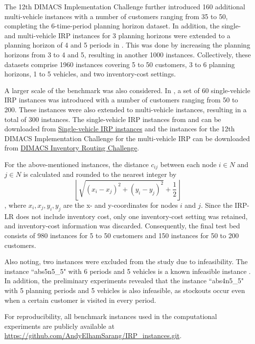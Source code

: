 \documentclass{article}
\begin{document}
The 12th DIMACS Implementation Challenge further introduced 160 additional multi-vehicle instances with a number of customers ranging from 35 to 50, completing the 6-time-period planning horizon dataset. In addition, the single- and multi-vehicle IRP instances for 3 planning horizons were extended to a planning horizon of 4 and 5 periods in \cite{archetti2017logistic}. This was done by increasing the planning horizons from 3 to 4 and 5, resulting in another 1000 instances. Collectively, these datasets comprise 1960 instances covering 5 to 50 customers, 3 to 6 planning horizons, 1 to 5 vehicles, and two inventory-cost settings. 

A larger scale of the benchmark was also considered. In \cite{archetti2012hybrid}, a set of 60 single-vehicle IRP instances was introduced with a number of customers ranging from 50 to 200. These instances were also extended to multi-vehicle instances, resulting in a total of 300 instances. The single-vehicle IRP instances from \cite{archetti2007branch} and \cite{archetti2012hybrid} can be downloaded from \href{http://www.leandro-coelho.com/instances/inventory-routing/}{Single-vehicle IRP instances} and the instances for the 12th DIMACS Implementation Challenge for the multi-vehicle IRP can be downloaded from \href{https://dimacs.rutgers.edu/programs/implementation-challenges/vehicle-routing/implementation-challenge-vehicle-routing/inventory-routing}{DIMACS Inventory Routing Challenge}. 

For the above-mentioned instances, the distance $c_{ij}$ between each node $i\in N$ and $j\in N$ is calculated and rounded to the nearest integer by \[ \left\lfloor \sqrt{(x_i-x_j)^2 + (y_i-y_j)^2} +\frac{1}{2} \right\rfloor \], where $x_i,x_j,y_i,y_j$ are the x- and y-coordinates for nodes $i$ and $j$. Since the IRP-LR does not include inventory cost, only one inventory-cost setting was retained, and inventory-cost information was discarded. Consequently, the final test bed consists of 980 instances for 5 to 50 customers and 150 instances for 50 to 200 customers. 

Also noting, two instances were excluded from the study due to infeasibility. The instance ``abs5n5\_5" with 6 periods and 5 vehicles is a known infeasible instance \cite{alvarez2018iterated}. In addition, the preliminary experiments revealed that the instance ``abs4n5\_5" with 5 planning periods and 5 vehicles is also infeasible, as stockouts occur even when a certain customer is visited in every period.

For reproducibility, all benchmark instances used in the computational experiments are publicly 
available at \url{https://github.com/AndyElhamSarang/IRP_instances.git}.
\end{document}
